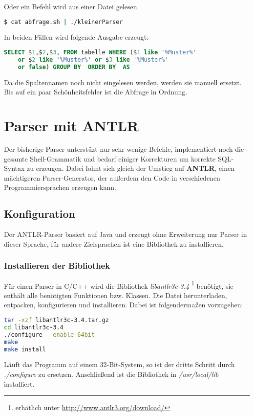 Oder ein Befehl wird aus einer Datei gelesen.
\begin{lstlisting}[language=Bash]
$ cat abfrage.sh | ./kleinerParser
\end{lstlisting}

In beiden Fällen wird folgende Ausgabe erzeugt:
\begin{lstlisting}[language=SQL]
SELECT $1,$2,$3, FROM tabelle WHERE ($1 like '%Muster%'
	or $2 like '%Muster%' or $3 like '%Muster%' 
	or false) GROUP BY  ORDER BY  AS
\end{lstlisting}

Da die Spaltennamen noch nicht eingelesen werden, werden sie manuell ersetzt. Bis auf ein paar Schönheitsfehler ist die Abfrage in Ordnung.

\chapter{Parser mit ANTLR}
Der bisherige Parser unterstüzt nur sehr wenige Befehle, implementiert noch die gesamte Shell-Grammatik und bedarf einiger Korrekturen um korrekte SQL-Syntax zu erzeugen. Dabei lohnt sich gleich der Umstieg auf \textbf{ANTLR}, einen mächtigeren Parser-Generator, der außerdem den Code in verschiedenen Programmiersprachen erzeugen kann.
\section{Konfiguration}
Der ANTLR-Parser basiert auf Java und erzeugt ohne Erweiterung nur Parser in dieser Sprache, für andere Zielsprachen ist eine Bibliothek zu installieren.

\subsection{Installieren der Bibliothek}
Für einen Parser in C/C++ wird die Bibliothek \textit{libantlr3c-3.4}
\footnote{\label{foot:1}erhätlich unter \url{http://www.antlr3.org/download/}}
benötigt, sie enthält alle benötigten Funktionen bzw. Klassen.
Die Datei herunterladen, entpacken, konfigurieren und installieren. Dabei ist folgendermaßen vorzugehen:
\begin{lstlisting}[language=Bash]
tar -xzf libantlr3c-3.4.tar.gz
cd libantlr3c-3.4
./configure --enable-64bit
make
make install
\end{lstlisting}
Läuft das Programm auf einem 32-Bit-System, so ist der dritte Schritt durch \textit{./configure} zu ersetzen. Anschließend ist die Bibliothek in \textit{/usr/local/lib} installiert.

